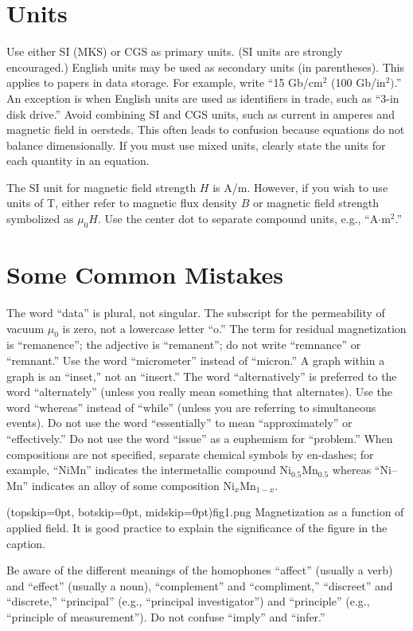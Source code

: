\documentclass{ieeeaccess}
\begin{document}
\section{Units}
Use either SI (MKS) or CGS as primary units. (SI units are strongly
encouraged.) English units may be used as secondary units (in parentheses).
This applies to papers in data storage. For example, write ``15
Gb/cm$^{2}$ (100 Gb/in$^{2})$.'' An exception is when
English units are used as identifiers in trade, such as ``3\textonehalf-in
disk drive.'' Avoid combining SI and CGS units, such as current in amperes
and magnetic field in oersteds. This often leads to confusion because
equations do not balance dimensionally. If you must use mixed units, clearly
state the units for each quantity in an equation.

The SI unit for magnetic field strength $H$ is A/m. However, if you wish to use
units of T, either refer to magnetic flux density $B$ or magnetic field
strength symbolized as $\mu _{0}H$. Use the center dot to separate
compound units, e.g., ``A$\cdot $m$^{2}$.''

\section{Some Common Mistakes}
The word ``data'' is plural, not singular. The subscript for the
permeability of vacuum $\mu _{0}$ is zero, not a lowercase letter
``o.'' The term for residual magnetization is ``remanence''; the adjective
is ``remanent''; do not write ``remnance'' or ``remnant.'' Use the word
``micrometer'' instead of ``micron.'' A graph within a graph is an
``inset,'' not an ``insert.'' The word ``alternatively'' is preferred to the
word ``alternately'' (unless you really mean something that alternates). Use
the word ``whereas'' instead of ``while'' (unless you are referring to
simultaneous events). Do not use the word ``essentially'' to mean
``approximately'' or ``effectively.'' Do not use the word ``issue'' as a
euphemism for ``problem.'' When compositions are not specified, separate
chemical symbols by en-dashes; for example, ``NiMn'' indicates the
intermetallic compound Ni$_{0.5}$Mn$_{0.5}$ whereas
``Ni--Mn'' indicates an alloy of some composition
Ni$_{x}$Mn$_{1-x}$.

\Figure[t!](topskip=0pt, botskip=0pt, midskip=0pt){fig1.png}
{Magnetization as a function of applied field.
It is good practice to explain the significance of the figure in the caption.\label{fig1}}

Be aware of the different meanings of the homophones ``affect'' (usually a
verb) and ``effect'' (usually a noun), ``complement'' and ``compliment,''
``discreet'' and ``discrete,'' ``principal'' (e.g., ``principal
investigator'') and ``principle'' (e.g., ``principle of measurement''). Do
not confuse ``imply'' and ``infer.''
\end{document}

